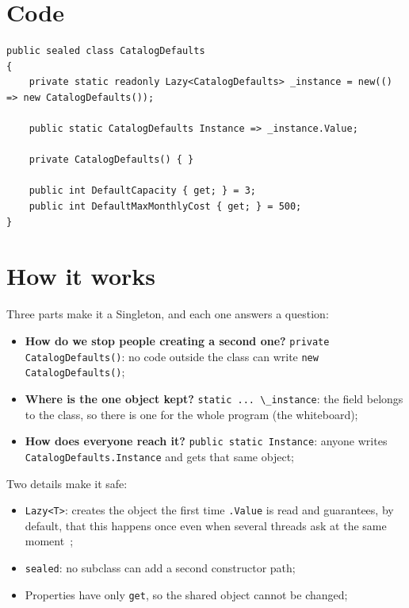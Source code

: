 \documentclass{utmreport}
\providecommand{\tightlist}{\setlength{\itemsep}{0pt}\setlength{\parskip}{0pt}}
\providecommand{\passthrough}[1]{#1}
\begin{document}
\section{Code}

\begin{lstlisting}
public sealed class CatalogDefaults
{
    private static readonly Lazy<CatalogDefaults> _instance = new(() => new CatalogDefaults());

    public static CatalogDefaults Instance => _instance.Value;

    private CatalogDefaults() { }

    public int DefaultCapacity { get; } = 3;
    public int DefaultMaxMonthlyCost { get; } = 500;
}
\end{lstlisting}

\section{How it works}

Three parts make it a Singleton, and each one answers a question:

\begin{itemize}
\tightlist
\item \textbf{How do we stop people creating a second one?} \passthrough{\lstinline!private CatalogDefaults()!}: no code outside the class can write \passthrough{\lstinline!new CatalogDefaults()!};
\item \textbf{Where is the one object kept?} \passthrough{\lstinline!static ... \_instance!}: the field belongs to the class, so there is one for the whole program (the whiteboard);
\item \textbf{How does everyone reach it?} \passthrough{\lstinline!public static Instance!}: anyone writes \passthrough{\lstinline!CatalogDefaults.Instance!} and gets that same object;
\end{itemize}

Two details make it safe:

\begin{itemize}
\tightlist
\item \passthrough{\lstinline!Lazy<T>!}: creates the object the first time \passthrough{\lstinline!.Value!} is read and guarantees, by default, that this happens once even when several threads ask at the same moment~\cite{lazy};
\item \passthrough{\lstinline!sealed!}: no subclass can add a second constructor path;
\item Properties have only \passthrough{\lstinline!get!}, so the shared object cannot be changed;
\end{itemize}
\end{document}
